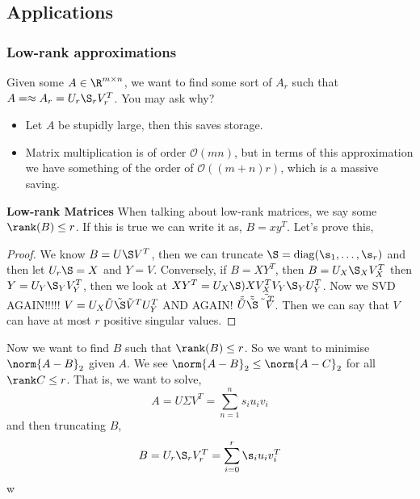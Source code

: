 \subsection{Applications}
\subsubsection{Low-rank approximations}
Given some $A \in \R^{m \times n}$, we want to find some sort of $A_r$ such that $A = \approx A_r = U_r \S_r V_r^T$. You may ask why?
\begin{itemize}
  \item Let $A$ be stupidly large, then this saves storage.
  \item Matrix multiplication is of order $\mathcal{O}(mn)$, but in terms of this approximation we have something of the order of $\mathcal{O}((m + n)r)$, which is a massive saving.
\end{itemize}

\noindent
\textbf{Low-rank Matrices}
When talking about low-rank matrices, we say some $\rank(B) \le r$. If this is true we can write it as, $B = xy^T$. Let's prove this,
\begin{proof}
  We know $B = U\S V^T$, then we can truncate $\S = \mathrm{diag}(\s_1, \dots, \s_r)$ and then let $U_r\S = X$ and $Y = V$. Conversely, if $B = XY^T$, then $B = U_X\S_X V_X^T$ then $Y = U_Y \S_Y V_Y^T$, then we look at $XY^T = U_X\S)X V_X^T V_Y \S_Y U_Y^T$. Now we SVD AGAIN!!!!! $V = U_X \tilde{U} \tilde \S \tilde V^T U_Y^T$ AND AGAIN! $\tilde{\tilde U} \tilde{\tilde \S} \tilde{\tilde V^T}$.
  Then we can say that $V$ can have at most $r$ positive singular values.
\end{proof}

\noindent
Now we want to find $B$ such that $\rank(B) \le r$. So we want to minimise $\norm{A - B}_2$ given $A$. We see $\norm{A - B}_2 \le \norm{A - C}_2$ for all $\rank C \le r$. That is, we want to solve,
$$ A = U\Sigma V^T = \sum_{n=1}^n s_i u_i v_i $$
and then truncating $B$,
$$ B = U_r\S_r V_r^T = \sum_{i=0}^r \s_i u_i v_i^T $$w